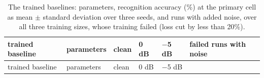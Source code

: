 \documentclass[10pt]{article}
\begin{document}
\begin{longtable}[]{@{}
  >{\raggedright\arraybackslash}p{}
  >{\raggedright\arraybackslash}p{}
  >{\raggedright\arraybackslash}p{}
  >{\raggedright\arraybackslash}p{}
  >{\raggedright\arraybackslash}p{}
  >{\raggedright\arraybackslash}p{}@{}}
\caption{The trained baselines: parameters, recognition accuracy (\%) at
the primary cell as mean \ensuremath{\pm} standard deviation over three
seeds, and runs with added noise, over all three training sizes, whose
training failed (loss cut by less than 20\%).}\tabularnewline
\toprule\noalign{}
\begin{minipage}[b]{\linewidth}\raggedright
trained baseline
\end{minipage} & \begin{minipage}[b]{\linewidth}\raggedright
parameters
\end{minipage} & \begin{minipage}[b]{\linewidth}\raggedright
clean
\end{minipage} & \begin{minipage}[b]{\linewidth}\raggedright
0 dB
\end{minipage} & \begin{minipage}[b]{\linewidth}\raggedright
\ensuremath{-}5 dB
\end{minipage} & \begin{minipage}[b]{\linewidth}\raggedright
failed runs with noise
\end{minipage} \\
\midrule\noalign{}
\endfirsthead
\toprule\noalign{}
\begin{minipage}[b]{\linewidth}\raggedright
trained baseline
\end{minipage} & \begin{minipage}[b]{\linewidth}\raggedright
parameters
\end{minipage} & \begin{minipage}[b]{\linewidth}\raggedright
clean
\end{minipage} & \begin{minipage}[b]{\linewidth}\raggedright
0 dB
\end{minipage} & \begin{minipage}[b]{\linewidth}\raggedright
\ensuremath{-}5 dB
\end{minipage} & \begin{minipage}[b]{\linewidth}\raggedright

\end{minipage}
\end{longtable}
\end{document}
